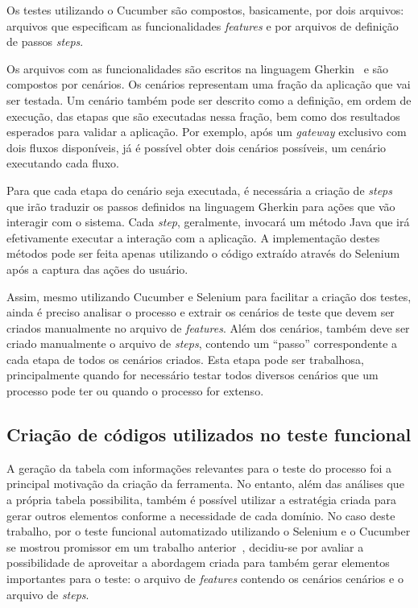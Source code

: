 \documentclass[12pt]{article}
\begin{document}
Os testes utilizando o Cucumber são compostos, basicamente, por dois arquivos: arquivos que especificam as funcionalidades \emph{features} e por arquivos de definição de passos \emph{steps}. 

Os arquivos com as funcionalidades são escritos na linguagem Gherkin~\cite{gherkin} e são compostos por cenários. Os cenários representam uma fração da aplicação que vai ser testada. Um cenário também pode ser descrito como a definição, em ordem de execução, das etapas que são executadas nessa fração, bem como dos resultados esperados para validar a aplicação. Por exemplo, após um \emph{gateway} exclusivo com dois fluxos disponíveis, já é possível obter dois cenários possíveis, um cenário executando cada fluxo.

Para que cada etapa do cenário seja executada, é necessária a criação de \emph{steps} que irão traduzir os passos definidos na linguagem Gherkin para ações que vão interagir com o sistema. Cada \emph{step}, geralmente, invocará um método Java que irá efetivamente executar a interação com a aplicação. A implementação destes métodos pode ser feita apenas utilizando o código extraído através do Selenium após a captura das ações do usuário.

Assim, mesmo utilizando Cucumber e Selenium para facilitar a criação dos testes, ainda é preciso analisar o processo e extrair os cenários de teste que devem ser criados manualmente no arquivo de \emph{features}. Além dos cenários, também deve ser criado manualmente o arquivo de \emph{steps}, contendo um ``passo'' correspondente a cada etapa de todos os cenários criados. Esta etapa pode ser trabalhosa, principalmente quando for necessário testar todos diversos cenários que um processo pode ter ou quando o processo for extenso.

\subsection{Criação de códigos utilizados no teste funcional}
A geração da tabela com informações relevantes para o teste do processo foi a principal motivação da criação da ferramenta. No entanto, além das análises que a própria tabela possibilita, também é possível utilizar a estratégia criada para gerar outros elementos conforme a necessidade de cada domínio. No caso deste trabalho, por o teste funcional automatizado utilizando o Selenium e o Cucumber se mostrou promissor em um trabalho anterior~\cite{sbqs2015}, decidiu-se por avaliar a possibilidade de aproveitar a abordagem criada para também gerar elementos importantes para o teste: o arquivo de \emph{features} contendo os cenários cenários e o arquivo de \emph{steps}.
\end{document}
